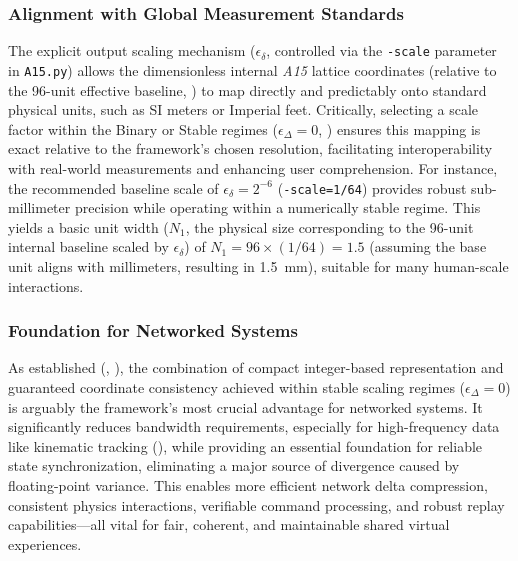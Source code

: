 \documentclass[10pt]{article}
\def\AAAB{\textit{A15}}
\begin{document}
\subsubsection{Alignment with Global Measurement Standards}\label{subsubsec:apps-measurement}
The explicit output scaling mechanism ($\epsilon_\delta$, controlled via the \texttt{-scale} parameter in \texttt{A15.py}) allows the dimensionless internal \AAAB{} lattice coordinates (relative to the 96-unit effective baseline, ) to map directly and predictably onto standard physical units, such as SI meters or Imperial feet. Critically, selecting a scale factor within the Binary or Stable regimes ($\epsilon_\Delta=0$, ) ensures this mapping is exact relative to the framework's chosen resolution, facilitating interoperability with real-world measurements and enhancing user comprehension. For instance, the recommended baseline scale of $\epsilon_\delta = 2^{-6}$ (\texttt{-scale=1/64}) provides robust sub-millimeter precision while operating within a numerically stable regime. This yields a basic unit width ($N_1$, the physical size corresponding to the 96-unit internal baseline scaled by $\epsilon_\delta$) of $N_1 = 96 \times (1/64) = 1.5$ (assuming the base unit aligns with millimeters, resulting in \SI{1.5}{\milli\meter}), suitable for many human-scale interactions.

\subsubsection{Foundation for Networked Systems}\label{subsubsec:apps-network}
As established (, ), the combination of compact integer-based representation and guaranteed coordinate consistency achieved within stable scaling regimes ($\epsilon_\Delta = 0$) is arguably the framework's most crucial advantage for networked systems. It significantly reduces bandwidth requirements, especially for high-frequency data like kinematic tracking (), while providing an essential foundation for reliable state synchronization, eliminating a major source of divergence caused by floating-point variance. This enables more efficient network delta compression, consistent physics interactions, verifiable command processing, and robust replay capabilities—all vital for fair, coherent, and maintainable shared virtual experiences.
\end{document}
